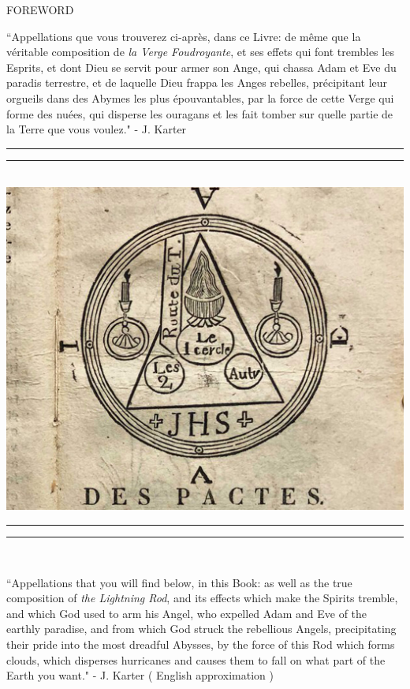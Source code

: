 \documentclass[11pt]{article}
\begin{document}
\begin{center}
\huge FOREWORD
\end{center}

\begingroup
\begin{center}
``Appellations que vous trouverez ci-après, dans ce Livre: de même que la véritable composition de \textit{la Verge Foudroyante}, et ses effets qui font trembles les Esprits, et dont Dieu se servit pour armer son Ange, qui chassa Adam et Eve du paradis terrestre, et de laquelle Dieu frappa les Anges rebelles, précipitant leur orgueils dans des Abymes les plus épouvantables, par la force de cette Verge qui forme des nuées, qui disperse les ouragans et les fait tomber sur quelle partie de la Terre que vous voulez."
\rightskip\leftskip
\phantom{text} \hfill - J. Karter
\end{center}
\endgroup


\begingroup
\begin{center}
\rule{\textwidth}{1.6pt}\vspace*{-\baselineskip}\vspace*{1pt}
\rule{\textwidth}{0.4pt}\\[\baselineskip]
\includegraphics[scale=0.20]{verge.jpeg}
\rule{\textwidth}{0.4pt}\vspace*{-\baselineskip}\vspace{2pt}
\rule{\textwidth}{1.6pt}\\[\baselineskip]
\end{center}
\endgroup

\begingroup
\begin{center}
``Appellations that you will find below, in this Book: as well as the true composition of \textit{the Lightning Rod}, and its effects which make the Spirits tremble, and which God used to arm his Angel, who expelled Adam and Eve of the earthly paradise, and from which God struck the rebellious Angels, precipitating their pride into the most dreadful Abysses, by the force of this Rod which forms clouds, which disperses hurricanes and causes them to fall on what part of the Earth you want."
\rightskip\leftskip
\phantom{text} \hfill - J. Karter ( English approximation )
\end{center}
\endgroup
\end{document}
